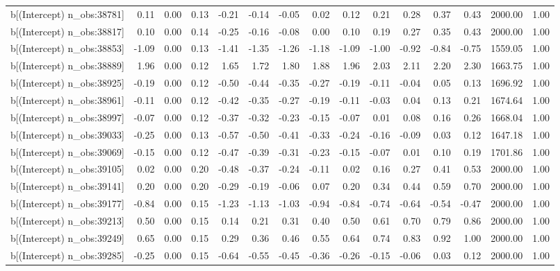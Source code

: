 \begin{table}[ht]
\begin{tabular}{rrrrrrrrrrrrrrr}
  b[(Intercept) n\_obs:38781] & 0.11 & 0.00 & 0.13 & -0.21 & -0.14 & -0.05 & 0.02 & 0.12 & 0.21 & 0.28 & 0.37 & 0.43 & 2000.00 & 1.00 \\ 
  b[(Intercept) n\_obs:38817] & 0.10 & 0.00 & 0.14 & -0.25 & -0.16 & -0.08 & 0.00 & 0.10 & 0.19 & 0.27 & 0.35 & 0.43 & 2000.00 & 1.00 \\ 
  b[(Intercept) n\_obs:38853] & -1.09 & 0.00 & 0.13 & -1.41 & -1.35 & -1.26 & -1.18 & -1.09 & -1.00 & -0.92 & -0.84 & -0.75 & 1559.05 & 1.00 \\ 
  b[(Intercept) n\_obs:38889] & 1.96 & 0.00 & 0.12 & 1.65 & 1.72 & 1.80 & 1.88 & 1.96 & 2.03 & 2.11 & 2.20 & 2.30 & 1663.75 & 1.00 \\ 
  b[(Intercept) n\_obs:38925] & -0.19 & 0.00 & 0.12 & -0.50 & -0.44 & -0.35 & -0.27 & -0.19 & -0.11 & -0.04 & 0.05 & 0.13 & 1696.92 & 1.00 \\ 
  b[(Intercept) n\_obs:38961] & -0.11 & 0.00 & 0.12 & -0.42 & -0.35 & -0.27 & -0.19 & -0.11 & -0.03 & 0.04 & 0.13 & 0.21 & 1674.64 & 1.00 \\ 
  b[(Intercept) n\_obs:38997] & -0.07 & 0.00 & 0.12 & -0.37 & -0.32 & -0.23 & -0.15 & -0.07 & 0.01 & 0.08 & 0.16 & 0.26 & 1668.04 & 1.00 \\ 
  b[(Intercept) n\_obs:39033] & -0.25 & 0.00 & 0.13 & -0.57 & -0.50 & -0.41 & -0.33 & -0.24 & -0.16 & -0.09 & 0.03 & 0.12 & 1647.18 & 1.00 \\ 
  b[(Intercept) n\_obs:39069] & -0.15 & 0.00 & 0.12 & -0.47 & -0.39 & -0.31 & -0.23 & -0.15 & -0.07 & 0.01 & 0.10 & 0.19 & 1701.86 & 1.00 \\ 
  b[(Intercept) n\_obs:39105] & 0.02 & 0.00 & 0.20 & -0.48 & -0.37 & -0.24 & -0.11 & 0.02 & 0.16 & 0.27 & 0.41 & 0.53 & 2000.00 & 1.00 \\ 
  b[(Intercept) n\_obs:39141] & 0.20 & 0.00 & 0.20 & -0.29 & -0.19 & -0.06 & 0.07 & 0.20 & 0.34 & 0.44 & 0.59 & 0.70 & 2000.00 & 1.00 \\ 
  b[(Intercept) n\_obs:39177] & -0.84 & 0.00 & 0.15 & -1.23 & -1.13 & -1.03 & -0.94 & -0.84 & -0.74 & -0.64 & -0.54 & -0.47 & 2000.00 & 1.00 \\ 
  b[(Intercept) n\_obs:39213] & 0.50 & 0.00 & 0.15 & 0.14 & 0.21 & 0.31 & 0.40 & 0.50 & 0.61 & 0.70 & 0.79 & 0.86 & 2000.00 & 1.00 \\ 
  b[(Intercept) n\_obs:39249] & 0.65 & 0.00 & 0.15 & 0.29 & 0.36 & 0.46 & 0.55 & 0.64 & 0.74 & 0.83 & 0.92 & 1.00 & 2000.00 & 1.00 \\ 
  b[(Intercept) n\_obs:39285] & -0.25 & 0.00 & 0.15 & -0.64 & -0.55 & -0.45 & -0.36 & -0.26 & -0.15 & -0.06 & 0.03 & 0.12 & 2000.00 & 1.00 \\ 

\end{tabular}
\end{table}
